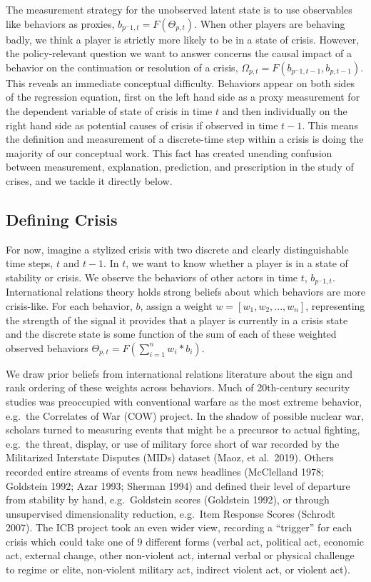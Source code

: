 \documentclass[
  letterpaper,
  DIV=11,
  numbers=noendperiod]{scrartcl}
\begin{document}
The measurement strategy for the unobserved latent state is to use
observables like behaviors as proxies, \(b_{p^-1,t}=F(\Theta_{p,t})\).
When other players are behaving badly, we think a player is strictly
more likely to be in a state of crisis. However, the policy-relevant
question we want to answer concerns the causal impact of a behavior on
the continuation or resolution of a crisis,
\(\Omega_{p,t}=F(b_{p^-1,t-1},b_{p,t-1})\). This reveals an immediate
conceptual difficulty. Behaviors appear on both sides of the regression
equation, first on the left hand side as a proxy measurement for the
dependent variable of state of crisis in time \(t\) and then
individually on the right hand side as potential causes of crisis if
observed in time \(t-1\). This means the definition and measurement of a
discrete-time step within a crisis is doing the majority of our
conceptual work. This fact has created unending confusion between
measurement, explanation, prediction, and prescription in the study of
crises, and we tackle it directly below.

\subsection{Defining Crisis}\label{defining-crisis}

For now, imagine a stylized crisis with two discrete and clearly
distinguishable time steps, \(t\) and \(t-1\). In \(t\), we want to know
whether a player is in a state of stability or crisis. We observe the
behaviors of other actors in time \(t\), \(b_{p^-1,t}\). International
relations theory holds strong beliefs about which behaviors are more
crisis-like. For each behavior, \(b\), assign a weight
\(w=[w_1,w_2,...,w_n]\), representing the strength of the signal it
provides that a player is currently in a crisis state and the discrete
state is some function of the sum of each of these weighted observed
behaviors \(\Theta_{p,t}=F(\sum^n_{i=1}w_i*b_i)\).

We draw prior beliefs from international relations literature about the
sign and rank ordering of these weights across behaviors. Much of
20th-century security studies was preoccupied with conventional warfare
as the most extreme behavior, e.g.~the Correlates of War (COW) project.
In the shadow of possible nuclear war, scholars turned to measuring
events that might be a precursor to actual fighting, e.g.~the threat,
display, or use of military force short of war recorded by the
Militarized Interstate Disputes (MIDs) dataset (Maoz, et al.~2019).
Others recorded entire streams of events from news headlines (McClelland
1978; Goldstein 1992; Azar 1993; Sherman 1994) and defined their level
of departure from stability by hand, e.g.~Goldstein scores (Goldstein
1992), or through unsupervised dimensionality reduction, e.g.~Item
Response Scores (Schrodt 2007). The ICB project took an even wider view,
recording a ``trigger'' for each crisis which could take one of 9
different forms (verbal act, political act, economic act, external
change, other non-violent act, internal verbal or physical challenge to
regime or elite, non-violent military act, indirect violent act, or
violent act).
\end{document}
